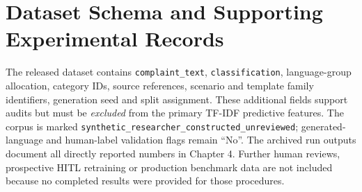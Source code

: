 \chapter{Dataset Schema and Supporting Experimental Records}
The released dataset contains \texttt{complaint\_text}, \texttt{classification}, language-group allocation, category IDs, source references, scenario and template family identifiers, generation seed and split assignment. These additional fields support audits but must be \emph{excluded} from the primary TF-IDF predictive features. The corpus is marked \texttt{synthetic\_researcher\_constructed\_unreviewed}; generated-language and human-label validation flags remain ``No''. The archived run outputs document all directly reported numbers in Chapter 4. Further human reviews, prospective HITL retraining or production benchmark data are not included because no completed results were provided for those procedures.
